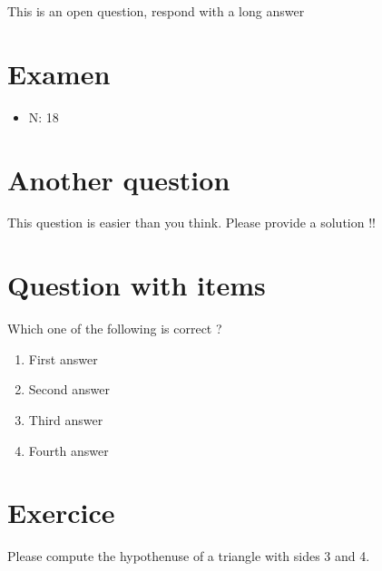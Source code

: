 \documentclass[a4paper,11pt,twoside]{article}
\begin{document}
This is an open question, respond with a long answer


\subsection*{}
\label{sec:org0788fc6}

\cleardoublepage

\section*{Examen}
\label{sec:orgf196641}
\begin{itemize}
\item N: 18
\end{itemize}
\section*{Another question}
\label{sec:org52758e4}

This question is easier than you think. Please provide a solution !!



\section*{Question with items}
\label{sec:org61a1c90}

Which one of the following is correct ?

\begin{enumerate}
\item First answer
\item Second answer
\item Third answer
\item Fourth answer
\end{enumerate}



\section*{Exercice}
\label{sec:org895f51d}

Please compute the hypothenuse of a triangle with sides 3 and 4.



\subsection*{}
\label{sec:orgd42ebaf}

\cleardoublepage
\end{document}
